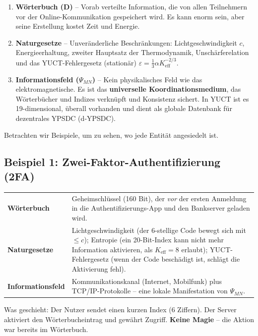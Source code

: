 \documentclass[12pt,a4paper]{article}
\begin{document}
	\begin{enumerate}
		\item \textbf{Wörterbuch (D)} – Vorab verteilte Information, die von allen Teilnehmern vor der Online-Kommunikation gespeichert wird. Es kann enorm sein, aber seine Erstellung kostet Zeit und Energie.
		\item \textbf{Naturgesetze} – Unveränderliche Beschränkungen: Lichtgeschwindigkeit \(c\), Energieerhaltung, zweiter Hauptsatz der Thermodynamik, Unschärferelation und das YUCT-Fehlergesetz (stationär) \(\varepsilon = \frac13 \alpha K_{\mathrm{eff}}^{-2/3}\).
		\item \textbf{Informationsfeld (\(\Psi_{MN}\))} – Kein physikalisches Feld wie das elektromagnetische. Es ist das \textbf{universelle Koordinationsmedium}, das Wörterbücher und Indizes verknüpft und Konsistenz sichert. In YUCT ist es 19-dimensional, überall vorhanden und dient als globale Datenbank für dezentrales YPSDC (d‑YPSDC).
	\end{enumerate}
	
	Betrachten wir Beispiele, um zu sehen, wo jede Entität angesiedelt ist.
	
	\subsection{Beispiel 1: Zwei-Faktor-Authentifizierung (2FA)}
	\begin{tabular}{p{2.8cm} p{10cm}}
		\textbf{Wörterbuch} & Geheimschlüssel (160 Bit), der \emph{vor} der ersten Anmeldung in die Authentifizierungs-App und den Bankserver geladen wird. \\
		\textbf{Naturgesetze} & Lichtgeschwindigkeit (der 6-stellige Code bewegt sich mit \(\le c\)); Entropie (ein 20-Bit-Index kann nicht mehr Information aktivieren, als \(K_{\mathrm{eff}}=8\) erlaubt); YUCT-Fehlergesetz (wenn der Code beschädigt ist, schlägt die Aktivierung fehl). \\
		\textbf{Informationsfeld} & Kommunikationskanal (Internet, Mobilfunk) plus TCP/IP-Protokolle – eine lokale Manifestation von \(\Psi_{MN}\). \\
	\end{tabular}
	
	\noindent Was geschieht: Der Nutzer sendet einen kurzen Index (6 Ziffern). Der Server aktiviert den Wörterbucheintrag und gewährt Zugriff. \textbf{Keine Magie} – die Aktion war bereits im Wörterbuch.
	
\end{document}
